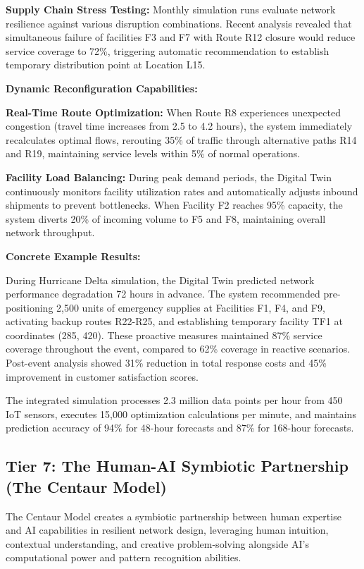 \documentclass{article}
\begin{document}
\textbf{Supply Chain Stress Testing:} Monthly simulation runs evaluate network resilience against various disruption combinations. Recent analysis revealed that simultaneous failure of facilities F3 and F7 with Route R12 closure would reduce service coverage to 72\%, triggering automatic recommendation to establish temporary distribution point at Location L15.

\textbf{Dynamic Reconfiguration Capabilities:}

\textbf{Real-Time Route Optimization:} When Route R8 experiences unexpected congestion (travel time increases from 2.5 to 4.2 hours), the system immediately recalculates optimal flows, rerouting 35\% of traffic through alternative paths R14 and R19, maintaining service levels within 5\% of normal operations.

\textbf{Facility Load Balancing:} During peak demand periods, the Digital Twin continuously monitors facility utilization rates and automatically adjusts inbound shipments to prevent bottlenecks. When Facility F2 reaches 95\% capacity, the system diverts 20\% of incoming volume to F5 and F8, maintaining overall network throughput.

\textbf{Concrete Example Results:}

During Hurricane Delta simulation, the Digital Twin predicted network performance degradation 72 hours in advance. The system recommended pre-positioning 2,500 units of emergency supplies at Facilities F1, F4, and F9, activating backup routes R22-R25, and establishing temporary facility TF1 at coordinates (285, 420). These proactive measures maintained 87\% service coverage throughout the event, compared to 62\% coverage in reactive scenarios. Post-event analysis showed 31\% reduction in total response costs and 45\% improvement in customer satisfaction scores.

The integrated simulation processes 2.3 million data points per hour from 450 IoT sensors, executes 15,000 optimization calculations per minute, and maintains prediction accuracy of 94\% for 48-hour forecasts and 87\% for 168-hour forecasts.

\subsection{Tier 7: The Human-AI Symbiotic Partnership (The Centaur Model)}

The Centaur Model creates a symbiotic partnership between human expertise and AI capabilities in resilient network design, leveraging human intuition, contextual understanding, and creative problem-solving alongside AI's computational power and pattern recognition abilities.
\end{document}
